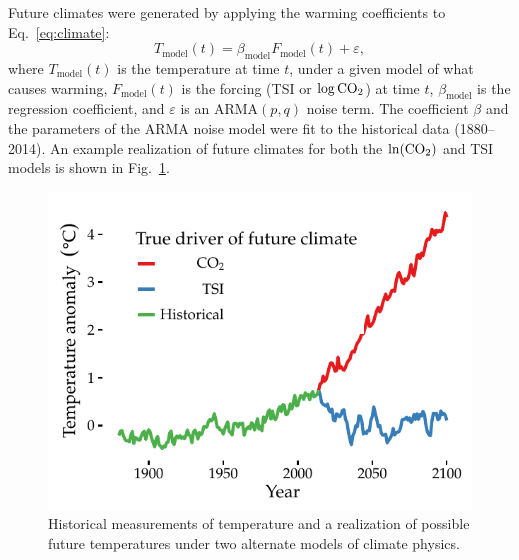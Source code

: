 \documentclass{wscpaperproc}\usepackage[]{graphicx}\usepackage[]{color}
\makeatletter
\def\maxwidth{ %
  \ifdim\Gin@nat@width>\linewidth
    \linewidth
  \else
    \Gin@nat@width
  \fi
}
\newenvironment{knitrout}{}{} %
\newcommand{\ARMA}{\text{ARMA}}
\makeatother
\begin{document}
Future climates were generated by applying the warming coefficients to Eq.~\ref{eq:climate}:
\begin{equation}
T_{\text{model}}(t) = \beta_{\text{model}} F_{\text{model}}(t) + \varepsilon,
\label{eq:climate}
\end{equation}
where $T_{\text{model}}(t)$ is the temperature at time $t$, under a given model of what causes warming,
$F_{\text{model}}(t)$ is the forcing (TSI or $\log\ce{CO2}$) at time $t$,
$\beta_{\text{model}}$ is the regression coefficient, and
$\varepsilon$ is an $\ARMA(p,q)$ noise term.
The coefficient $\beta$ and the parameters of the ARMA noise model were fit to the historical data (1880--2014).
An example realization of future climates for both the $\ln(\ce{CO2})$ and TSI models is shown in Fig.~\ref{fig:climateplot}.

\begin{knitrout}
\color{fgcolor}\begin{figure}

{\centering \includegraphics[width=\maxwidth]{figure/climateplot-1} 

}

\caption[Historical measurements of temperature and a realization of possible future temperatures under two alternate models of climate physics]{Historical measurements of temperature and a realization of possible future temperatures under two alternate models of climate physics.}\label{fig:climateplot}
\end{figure}


\end{knitrout}
\end{document}
